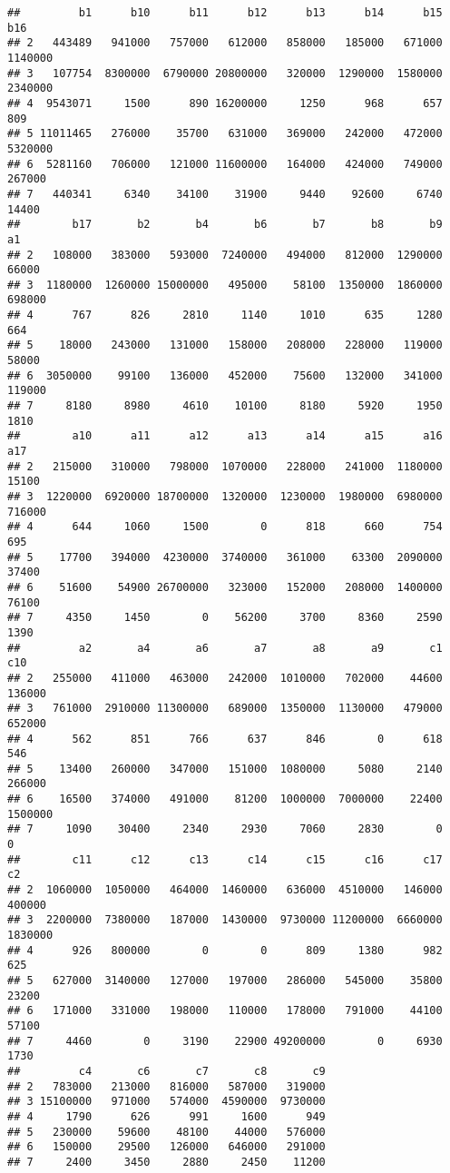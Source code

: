 \documentclass[
]{article}
\begin{document}
\begin{verbatim}
##         b1      b10      b11      b12      b13      b14      b15      b16
## 2   443489   941000   757000   612000   858000   185000   671000  1140000
## 3   107754  8300000  6790000 20800000   320000  1290000  1580000  2340000
## 4  9543071     1500      890 16200000     1250      968      657      809
## 5 11011465   276000    35700   631000   369000   242000   472000  5320000
## 6  5281160   706000   121000 11600000   164000   424000   749000   267000
## 7   440341     6340    34100    31900     9440    92600     6740    14400
##        b17       b2       b4       b6       b7       b8       b9       a1
## 2   108000   383000   593000  7240000   494000   812000  1290000    66000
## 3  1180000  1260000 15000000   495000    58100  1350000  1860000   698000
## 4      767      826     2810     1140     1010      635     1280      664
## 5    18000   243000   131000   158000   208000   228000   119000    58000
## 6  3050000    99100   136000   452000    75600   132000   341000   119000
## 7     8180     8980     4610    10100     8180     5920     1950     1810
##        a10      a11      a12      a13      a14      a15      a16      a17
## 2   215000   310000   798000  1070000   228000   241000  1180000    15100
## 3  1220000  6920000 18700000  1320000  1230000  1980000  6980000   716000
## 4      644     1060     1500        0      818      660      754      695
## 5    17700   394000  4230000  3740000   361000    63300  2090000    37400
## 6    51600    54900 26700000   323000   152000   208000  1400000    76100
## 7     4350     1450        0    56200     3700     8360     2590     1390
##         a2       a4       a6       a7       a8       a9       c1      c10
## 2   255000   411000   463000   242000  1010000   702000    44600   136000
## 3   761000  2910000 11300000   689000  1350000  1130000   479000   652000
## 4      562      851      766      637      846        0      618      546
## 5    13400   260000   347000   151000  1080000     5080     2140   266000
## 6    16500   374000   491000    81200  1000000  7000000    22400  1500000
## 7     1090    30400     2340     2930     7060     2830        0        0
##        c11      c12      c13      c14      c15      c16      c17       c2
## 2  1060000  1050000   464000  1460000   636000  4510000   146000   400000
## 3  2200000  7380000   187000  1430000  9730000 11200000  6660000  1830000
## 4      926   800000        0        0      809     1380      982      625
## 5   627000  3140000   127000   197000   286000   545000    35800    23200
## 6   171000   331000   198000   110000   178000   791000    44100    57100
## 7     4460        0     3190    22900 49200000        0     6930     1730
##         c4       c6       c7       c8       c9
## 2   783000   213000   816000   587000   319000
## 3 15100000   971000   574000  4590000  9730000
## 4     1790      626      991     1600      949
## 5   230000    59600    48100    44000   576000
## 6   150000    29500   126000   646000   291000
## 7     2400     3450     2880     2450    11200
\end{verbatim}
\end{document}
